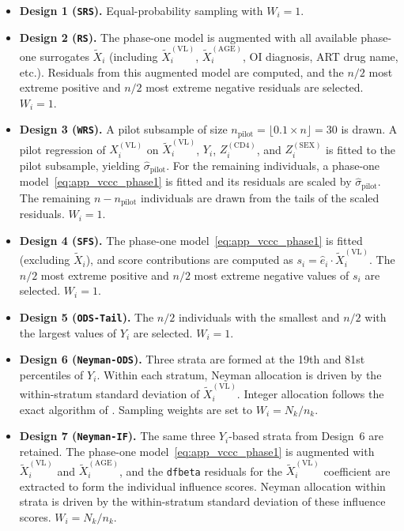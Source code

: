 \begin{itemize}[leftmargin=2em]
\item \textbf{Design 1 (\texttt{SRS}).} Equal-probability sampling with $W_i = 1$.

\item \textbf{Design 2 (\texttt{RS}).} The phase-one model is augmented with all available phase-one surrogates $\tilde{X}_i$ (including $\tilde{X}_i^{(\mathrm{VL})}$, $\tilde{X}_i^{(\mathrm{AGE})}$, OI diagnosis, ART drug name, etc.). Residuals from this augmented model are computed, and the $n/2$ most extreme positive and $n/2$ most extreme negative residuals are selected. $W_i = 1$.

\item \textbf{Design 3 (\texttt{WRS}).} A pilot subsample of size $n_{\mathrm{pilot}} = \lfloor 0.1 \times n \rfloor = 30$ is drawn. A pilot regression of $X_i^{(\mathrm{VL})}$ on $\tilde{X}_i^{(\mathrm{VL})}$, $Y_i$, $Z_i^{(\mathrm{CD4})}$, and $Z_i^{(\mathrm{SEX})}$ is fitted to the pilot subsample, yielding $\hat{\sigma}_{\mathrm{pilot}}$. For the remaining individuals, a phase-one model~\eqref{eq:app_vccc_phase1} is fitted and its residuals are scaled by $\hat{\sigma}_{\mathrm{pilot}}$. The remaining $n - n_{\mathrm{pilot}}$ individuals are drawn from the tails of the scaled residuals. $W_i = 1$.

\item \textbf{Design 4 (\texttt{SFS}).} The phase-one model~\eqref{eq:app_vccc_phase1} is fitted (excluding $\tilde{X}_i$), and score contributions are computed as $s_i = \hat{e}_i \cdot \tilde{X}_i^{(\mathrm{VL})}$. The $n/2$ most extreme positive and $n/2$ most extreme negative values of $s_i$ are selected. $W_i = 1$.

\item \textbf{Design 5 (\texttt{ODS-Tail}).} The $n/2$ individuals with the smallest and $n/2$ with the largest values of $Y_i$ are selected. $W_i = 1$.

\item \textbf{Design 6 (\texttt{Neyman-ODS}).} Three strata are formed at the 19th and 81st percentiles of $Y_i$. Within each stratum, Neyman allocation is driven by the within-stratum standard deviation of $\tilde{X}_i^{(\mathrm{VL})}$. Integer allocation follows the exact algorithm of \citet{wright2017exact}. Sampling weights are set to $W_i = N_k / n_k$.

\item \textbf{Design 7 (\texttt{Neyman-IF}).} The same three $Y_i$-based strata from Design~6 are retained. The phase-one model~\eqref{eq:app_vccc_phase1} is augmented with $\tilde{X}_i^{(\mathrm{VL})}$ and $\tilde{X}_i^{(\mathrm{AGE})}$, and the \texttt{dfbeta} residuals for the $\tilde{X}_i^{(\mathrm{VL})}$ coefficient are extracted to form the individual influence scores. Neyman allocation within strata is driven by the within-stratum standard deviation of these influence scores. $W_i = N_k / n_k$.

\end{itemize}

